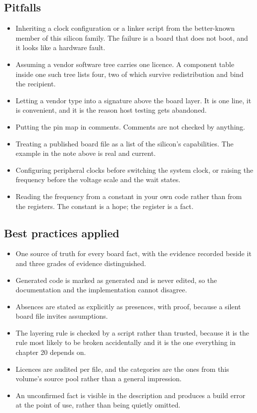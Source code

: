 \subsection*{Pitfalls}

\begin{itemize}
\item Inheriting a clock configuration or a linker script from the better-known
member of this silicon family. The failure is a board that does not boot, and it
looks like a hardware fault.
\item Assuming a vendor software tree carries one licence. A component table
inside one such tree lists four, two of which survive redistribution and bind
the recipient.
\item Letting a vendor type into a signature above the board layer. It is one
line, it is convenient, and it is the reason host testing gets abandoned.
\item Putting the pin map in comments. Comments are not checked by anything.
\item Treating a published board file as a list of the silicon's capabilities.
The example in the note above is real and current.
\item Configuring peripheral clocks before switching the system clock, or
raising the frequency before the voltage scale and the wait states.
\item Reading the frequency from a constant in your own code rather than from
the registers. The constant is a hope; the register is a fact.
\end{itemize}

\subsection*{Best practices applied}

\begin{itemize}
\item One source of truth for every board fact, with the evidence recorded
beside it and three grades of evidence distinguished.
\item Generated code is marked as generated and is never edited, so the
documentation and the implementation cannot disagree.
\item Absences are stated as explicitly as presences, with proof, because a
silent board file invites assumptions.
\item The layering rule is checked by a script rather than trusted, because it
is the rule most likely to be broken accidentally and it is the one everything
in chapter 20 depends on.
\item Licences are audited per file, and the categories are the ones from this
volume's source pool rather than a general impression.
\item An unconfirmed fact is visible in the description and produces a build
error at the point of use, rather than being quietly omitted.
\end{itemize}

